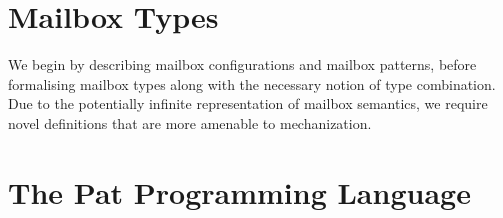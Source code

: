 \documentclass[runningheads]{llncs}
\begin{document}
%
%
%


%
%

\section{Mailbox Types}
\label{sec:sup-mailbox-types}

We begin by describing mailbox configurations and mailbox patterns, before formalising
mailbox types along with the necessary notion of type
combination. Due to the potentially infinite representation of mailbox
semantics, we require novel definitions that are more amenable to mechanization.




\section{The Pat Programming Language}
\label{sec:pat-programming-language}









% 



\end{document}
